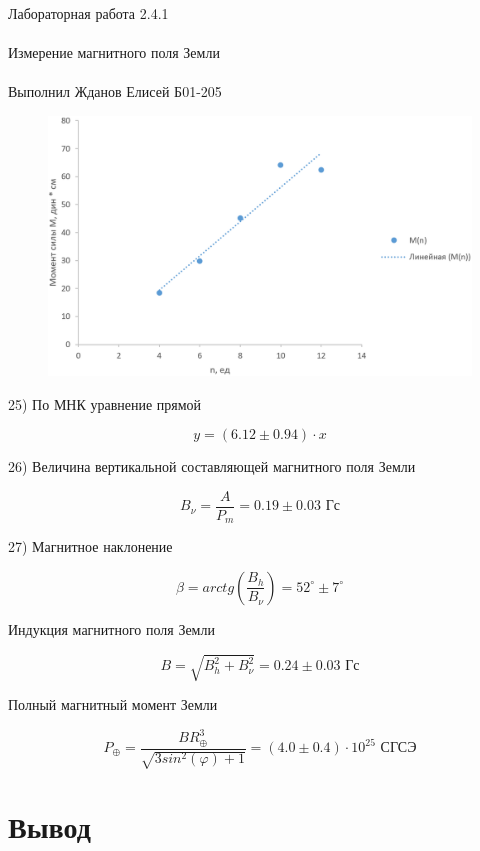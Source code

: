\documentclass{astroedu-lab}
\begin{document}
\begin{problem}{\huge Лабораторная работа 2.4.1\\\\Измерение магнитного поля Земли\\\\Выполнил Жданов Елисей Б01-205}
\begin{figure}[!h]
	\centering
	\includegraphics[width=1\textwidth]{график2.png}
	\label{fig:boiler}
\end{figure}

25) По МНК уравнение прямой

\begin{equation}
	y = (6.12 \pm 0.94) \cdot x
\end{equation}

26) Величина вертикальной составляющей магнитного поля Земли

\begin{equation}
	B_\nu = \frac{A}{P_m} = 0.19 \pm 0.03 \text{ Гс}
\end{equation}

27) Магнитное наклонение

\begin{equation}
	\beta = arctg\left(\frac{B_h}{B_\nu}\right) = 52^\circ \pm 7^\circ
\end{equation}

Индукция магнитного поля Земли

\begin{equation}
	B = \sqrt{B_h^2 + B_\nu^2} = 0.24 \pm 0.03 \text{ Гс}
\end{equation}

Полный магнитный момент Земли

\begin{equation}
	P_\oplus = \frac{B R_\oplus^3}{\sqrt{3 sin^2(\varphi) + 1}} = (4.0 \pm 0.4) \cdot 10^{25} \text{ СГСЭ}
\end{equation}

\section{Вывод}


\end{problem}
\end{document}
